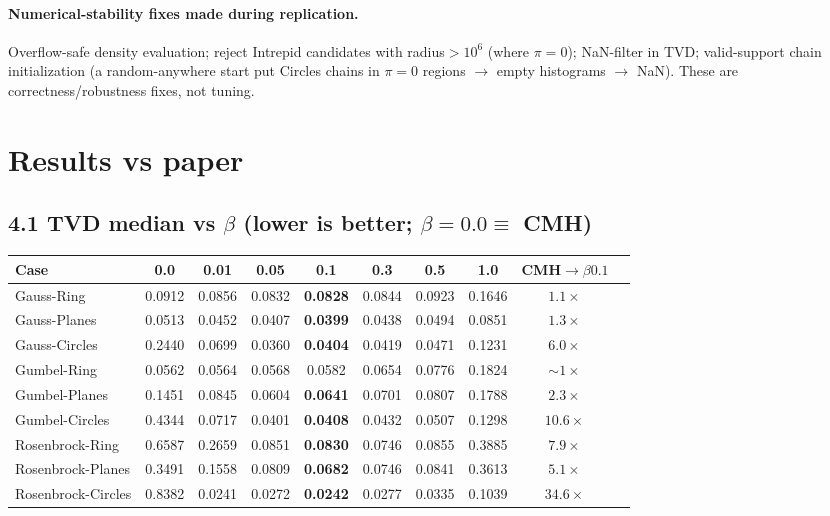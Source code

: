 \documentclass[11pt]{article}
\begin{document}
\paragraph{Numerical-stability fixes made during replication.}
Overflow-safe density evaluation; reject Intrepid candidates with
radius${>}10^6$ (where $\pi=0$); NaN-filter in TVD; valid-support chain
initialization (a random-anywhere start put Circles chains in $\pi=0$
regions $\to$ empty histograms $\to$ NaN). These are correctness/robustness
fixes, not tuning.

\section{Results vs paper}

\subsection*{4.1 TVD median vs $\beta$ (lower is better; $\beta{=}0.0 \equiv$ CMH)}

\begin{center}
\small
\begin{tabular}{lccccccccc}
\toprule
Case & 0.0 & 0.01 & 0.05 & 0.1 & 0.3 & 0.5 & 1.0 & CMH$\to\beta0.1$ \\
\midrule
Gauss-Ring         & 0.0912 & 0.0856 & 0.0832 & \textbf{0.0828} & 0.0844 & 0.0923 & 0.1646 & $1.1\times$ \\
Gauss-Planes       & 0.0513 & 0.0452 & 0.0407 & \textbf{0.0399} & 0.0438 & 0.0494 & 0.0851 & $1.3\times$ \\
Gauss-Circles      & 0.2440 & 0.0699 & 0.0360 & \textbf{0.0404} & 0.0419 & 0.0471 & 0.1231 & $\mathbf{6.0\times}$ \\
Gumbel-Ring        & 0.0562 & 0.0564 & 0.0568 & 0.0582 & 0.0654 & 0.0776 & 0.1824 & $\sim 1\times$ \\
Gumbel-Planes      & 0.1451 & 0.0845 & 0.0604 & \textbf{0.0641} & 0.0701 & 0.0807 & 0.1788 & $2.3\times$ \\
Gumbel-Circles     & 0.4344 & 0.0717 & 0.0401 & \textbf{0.0408} & 0.0432 & 0.0507 & 0.1298 & $\mathbf{10.6\times}$ \\
Rosenbrock-Ring    & 0.6587 & 0.2659 & 0.0851 & \textbf{0.0830} & 0.0746 & 0.0855 & 0.3885 & $\mathbf{7.9\times}$ \\
Rosenbrock-Planes  & 0.3491 & 0.1558 & 0.0809 & \textbf{0.0682} & 0.0746 & 0.0841 & 0.3613 & $\mathbf{5.1\times}$ \\
Rosenbrock-Circles & 0.8382 & 0.0241 & 0.0272 & \textbf{0.0242} & 0.0277 & 0.0335 & 0.1039 & $\mathbf{34.6\times}$ \\
\bottomrule
\end{tabular}
\end{center}
\end{document}
